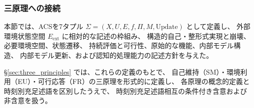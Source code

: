 \subsubsection*{三原理への接続}

本節では、ACSを7タプル
$\Sigma=(X,U,E,f,\Pi,M,\mathrm{Update})$ として定義し、
外部環境状態空間 $E_{\mathrm{ext}}$ に相対的な記述の枠組み、
構造的自己・整形式実現と崩壊、必要環境空間、状態遷移、
持続評価と可行性、原始的な機能、内部モデル構造、
内部モデル更新、および認知的処理能力の記述方針を与えた。

\S\ref{sec:three_principles} では、これらの定義のもとで、
自己維持（SM）・環境利用（EU）・可行応答（FR）の三原理を形式的に定義し、
各原理の概念的定義と時刻別充足述語を区別したうえで、
時刻別充足述語相互の条件付き含意および非含意を扱う。
